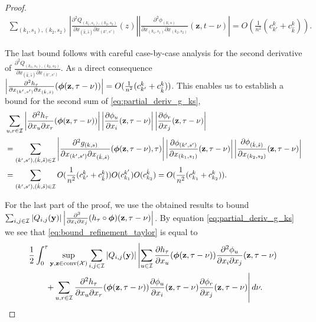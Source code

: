 \documentclass[acmsmall]{acmart}
\newcommand\by{\mathbf{y}}
\newcommand\bz{\mathbf{z}}
\newcommand\bphi{\text{\boldmath$\phi$}}
\newcommand\calX{\mathcal{X}}
\newcommand\calI{\mathcal{I}}
\newcommand\conv[1]{\mathrm{conv}(#1)}      %
\newcommand\abs[1]{\left|#1\right|}         %
\newcommand{\dd}[3]{ \frac{\partial^2 #1 }{ \partial x_{#2} \partial x_{#3}}}
\begin{document}
\begin{proof}
\begin{align*}
  \sum_{(k_1,s_1),(k_2,s_2)}  \abs{\frac{\partial^2 Q_{(k_1,s_1),(k_2,s_2)}}{\partial x_{(\hat{k},\hat{s})} \partial x_{(k',s')}}(z)} \abs{\dd{\phi_{(k,s)}}{(k_1,s_1)}{(k_2,s_2)}(\bz, t-\nu)}
  = O(\frac{1}{n^2}(c^k_{k'} + c^k_{\hat{k}})).
\end{align*}


The last bound follows with careful case-by-case analysis for the second derivative of $\frac{\partial^2 Q_{(k_1,s_1),(k_2,s_2)}}{\partial x_{(\hat{k},\hat{s})}\partial x_{(k',s')}}$. As a direct consequence $\abs{\frac{\partial^2 h_\tau}{\partial x_{(k',s')} \partial x_{(\hat{k},\hat{s})}}(\bphi (\bz, \tau-\nu))} = O(\frac{1}{n^2}(c^k_{k'} + c^k_{\hat{k}}))$. This enables us to establish a bound for the second sum of \eqref{eq:partial_deriv_g_ks},
\begin{align*}
  & \sum_{u, r \in \calI} \abs{\frac{\partial^2 h_\tau}{\partial x_u \partial x_r}(\bphi (\bz, \tau-\nu))} \abs{\frac{\partial \phi_u}{\partial x_i}(\bz,\tau-\nu)} \abs{\frac{\partial \phi_r}{\partial x_j}(\bz,\tau-\nu)} \\
  & = \sum_{(k',s'), (\hat{k},\hat{s}) \in \calI} \abs{\frac{\partial^2  g_{(k,s)}}{\partial x_{(k',s')} \partial x_{(\hat{k},\hat{s})}}(\bphi (\bz, \tau-\nu),\tau)} \abs{\frac{\partial \phi_{(k',s')}}{\partial x_{(k_1,s_1)}}(\bz,\tau-\nu)} \abs{\frac{\partial \phi_{(\hat{k},\hat{s})}}{\partial x_{(k_2,s_2)}}(\bz,\tau-\nu)} \\
  & = \sum_{(k',s'), (\hat{k},\hat{s}) \in \calI} O(\frac{1}{n^2}(c^k_{k'} + c^k_{\hat{k}}))O(c^{k'}_{k_1})O(c^{\hat{k}}_{k_2}) = O(\frac{1}{n^{2}}(c^k_{k_1} + c^k_{k_2})).
\end{align*}
\color{black}

For the last part of the proof, we use the obtained results to bound $\sum_{i,j\in \calI}\abs{Q_{i,j}(\by)}\abs{\frac{\partial^2}{\partial x_i \partial x_j} (h_\tau \circ \bphi)(\bz,\tau-\nu)}$. 
By equation \eqref{eq:partial_deriv_g_ks} we see that \eqref{eq:bound_refinement_taylor} is equal to 
\begin{align*}
& \frac{1}{2}\int_0^\tau \sup_{\by,\bz \in \conv{\calX}} \sum_{i,j\in \calI}\abs{Q_{i,j}(\by)} \left| \sum_{u \in \calI} \frac{\partial h_\tau}{\partial x_u}(\bphi (\bz, \tau-\nu))\frac{\partial^2 \phi_u}{\partial x_i \partial x_j}(\bz,\tau-\nu) \right. \\
&  \qquad \left. + \sum_{u, r \in \calI} \frac{\partial^2 h_\tau}{\partial x_u \partial x_r}(\bphi (\bz, \tau-\nu)) \frac{\partial \phi_u}{\partial x_i}(\bz,\tau-\nu) \frac{\partial \phi_r}{\partial x_j}(\bz,\tau-\nu) \right| d\nu.
\end{align*}


\end{proof}
\end{document}
